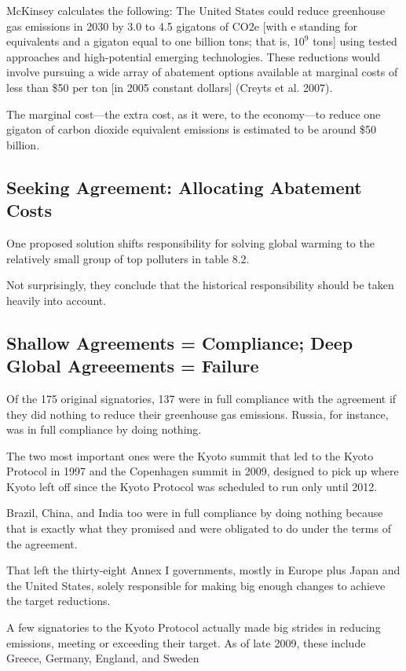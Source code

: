 McKinsey calculates the following: The United States could reduce greenhouse gas emissions in 2030 by 3.0 to 4.5 gigatons of CO2e [with e standing for equivalents and a gigaton equal to one billion tons; that is, $10^9$ tons] using tested approaches and high-potential emerging technologies. These reductions would involve pursuing a wide array of abatement options available at marginal costs of less than \$50 per ton [in 2005 constant dollars] (Creyts et al. 2007).

The marginal cost---the extra cost, as it were, to the economy---to reduce one gigaton of carbon dioxide equivalent emissions is estimated to be around \$50 billion.

\subsection{Seeking Agreement: Allocating Abatement Costs}
One proposed solution shifts responsibility for solving global warming to the relatively small group of top polluters in table 8.2.

Not surprisingly, they conclude that the historical responsibility should be taken heavily into account.

\subsection{Shallow Agreements = Compliance; Deep Global Agreeements = Failure}
Of the 175 original signatories, 137 were in full compliance with the agreement if they did
nothing to reduce their greenhouse gas emissions. Russia, for instance, was in full compliance
by doing nothing.

The two most important ones were the Kyoto summit that led to the Kyoto Protocol in 1997 and the Copenhagen summit in 2009, designed to pick up where Kyoto left off since the Kyoto Protocol was scheduled to run only until 2012.

Brazil, China, and India too were in full compliance by doing nothing because that is exactly what they promised and were obligated to do under the terms of the agreement.

That left the thirty-eight Annex I governments, mostly in Europe plus Japan and the United States, solely responsible for making big enough changes to achieve the target reductions.

A few signatories to the Kyoto Protocol actually made big strides in reducing emissions, meeting or exceeding their target. As of late 2009, these include Greece, Germany, England, and Sweden


